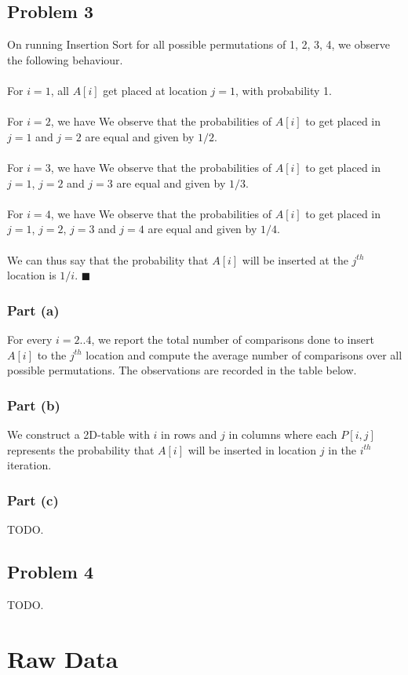\documentclass{article}
\begin{document}
\subsection{Problem 3}
On running Insertion Sort for all possible permutations of 1, 2, 3, 4, we observe the following behaviour.\\~\\
For $i=1$, all $A[i]$ get placed at location $j=1$, with probability 1.\\~\\
For $i=2$, we have
We observe that the probabilities of $A[i]$ to get placed in $j=1$ and $j=2$ are equal and given by $1/2$.\\~\\
For $i=3$, we have
We observe that the probabilities of $A[i]$ to get placed in $j=1$, $j=2$ and $j=3$ are equal and given by $1/3$.\\~\\
For $i=4$, we have
We observe that the probabilities of $A[i]$ to get placed in $j=1$, $j=2$, $j=3$ and $j=4$ are equal and given by $1/4$.\\\\
We can thus say that the probability that $A[i]$ will be inserted at the $j^{th}$ location is $1/i$. $\blacksquare$
\subsubsection{Part (a)}
For every $i=2..4$, we report the total number of comparisons done to insert $A[i]$ to the $j^{th}$ location and compute the average number of comparisons over all possible permutations. The observations are recorded in the table below.
\subsubsection{Part (b)}
We construct a 2D-table with $i$ in rows and $j$ in columns where each $P[i,j]$ represents the probability that $A[i]$ will be inserted in location $j$ in the $i^{th}$ iteration.
\subsubsection{Part (c)}
TODO.
\subsection{Problem 4}
TODO.
\section{Raw Data}
\label{sec:data}
\end{document}
